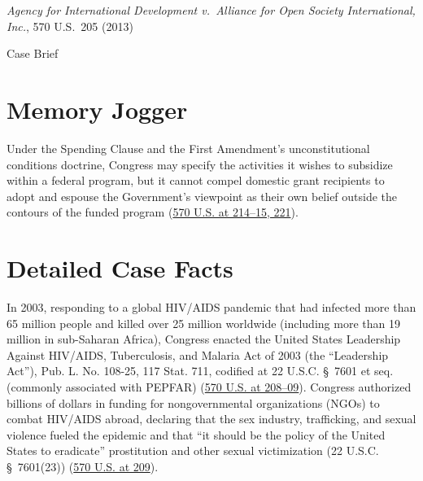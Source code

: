 \documentclass[12pt]{article}
\begin{document}
\begin{center}
{\LARGE \textit{Agency for International Development v.\ Alliance for Open Society International, Inc.}, 570 U.S.\ 205 (2013)\par}
\vspace{0.8em}
{\large Case Brief\par}
\end{center}
\vspace{1em}

\section{Memory Jogger}
Under the Spending Clause and the First Amendment's unconstitutional conditions doctrine, Congress may specify the activities it wishes to subsidize within a federal program, but it cannot compel domestic grant recipients to adopt and espouse the Government's viewpoint as their own belief outside the contours of the funded program (\href{https://supreme.justia.com/cases/federal/us/570/205/}{570 U.S. at 214--15, 221}).

\section{Detailed Case Facts}
In 2003, responding to a global HIV/AIDS pandemic that had infected more than 65 million people and killed over 25 million worldwide (including more than 19 million in sub-Saharan Africa), Congress enacted the United States Leadership Against HIV/AIDS, Tuberculosis, and Malaria Act of 2003 (the ``Leadership Act''), Pub. L. No. 108-25, 117 Stat. 711, codified at 22 U.S.C. \S~7601 et seq. (commonly associated with PEPFAR) (\href{https://supreme.justia.com/cases/federal/us/570/205/}{570 U.S. at 208--09}). Congress authorized billions of dollars in funding for nongovernmental organizations (NGOs) to combat HIV/AIDS abroad, declaring that the sex industry, trafficking, and sexual violence fueled the epidemic and that ``it should be the policy of the United States to eradicate'' prostitution and other sexual victimization (22 U.S.C. \S~7601(23)) (\href{https://supreme.justia.com/cases/federal/us/570/205/}{570 U.S. at 209}).
\end{document}
